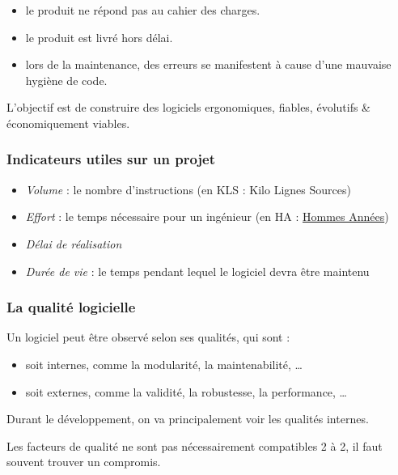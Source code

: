 \begin{itemize}
\tightlist
\item
  le produit ne répond pas au cahier des charges.
\item
  le produit est livré hors délai.
\item
  lors de la maintenance, des erreurs se manifestent à cause d'une
  mauvaise hygiène de code.
\end{itemize}

L'objectif est de construire des logiciels ergonomiques, fiables,
évolutifs \& économiquement viables.

\hypertarget{indicateurs-utiles-sur-un-projet}{%
\subsubsection{Indicateurs utiles sur un
projet}\label{indicateurs-utiles-sur-un-projet}}

\begin{itemize}
\tightlist
\item
  \emph{Volume} : le nombre d'instructions (en KLS : Kilo Lignes Sources)
\item
  \emph{Effort} : le temps nécessaire pour un ingénieur (en HA :
  \href{https://fr.wiktionary.org/wiki/homme-ann\%C3\%A9e}{Hommes
  Années})
\item
  \emph{Délai de réalisation}
\item
  \emph{Durée de vie} : le temps pendant lequel le logiciel devra être
  maintenu
\end{itemize}

\hypertarget{la-qualituxe9-logicielle}{%
\subsubsection{La qualité logicielle}\label{la-qualituxe9-logicielle}}

Un logiciel peut être observé selon ses qualités, qui sont :

\begin{itemize}
\tightlist
\item
  soit internes, comme la modularité, la maintenabilité, \ldots{}
\item
  soit externes, comme la validité, la robustesse, la performance,
  \ldots{}
\end{itemize}

Durant le développement, on va principalement voir les qualités
internes.

Les facteurs de qualité ne sont pas nécessairement compatibles 2 à 2, il
faut souvent trouver un compromis.

